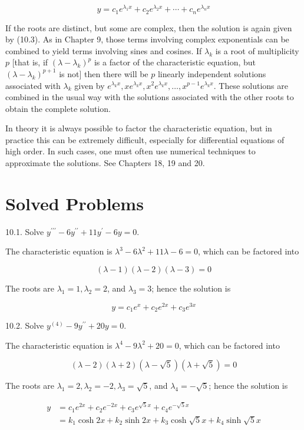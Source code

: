 \documentclass[10pt]{article}
\begin{document}
\begin{equation*}
y=c_{1} e^{\lambda_{1} x}+c_{2} e^{\lambda_{2} x}+\cdots+c_{n} e^{\lambda_{n} x} \tag{10.3}
\end{equation*}


If the roots are distinct, but some are complex, then the solution is again given by (10.3). As in Chapter 9, those terms involving complex exponentials can be combined to yield terms involving sines and cosines. If $\lambda_{k}$ is a root of multiplicity $p$ [that is, if $\left(\lambda-\lambda_{k}\right)^{p}$ is a factor of the characteristic equation, but $\left(\lambda-\lambda_{k}\right)^{p+1}$ is not] then there will be $p$ linearly independent solutions associated with $\lambda_{k}$ given by $e^{\lambda_{k} x}, x e^{\lambda_{k} x}, x^{2} e^{\lambda_{k} x}, \ldots, x^{p-1} e^{\lambda_{k} x}$. These solutions are combined in the usual way with the solutions associated with the other roots to obtain the complete solution.

In theory it is always possible to factor the characteristic equation, but in practice this can be extremely difficult, especially for differential equations of high order. In such cases, one must often use numerical techniques to approximate the solutions. See Chapters 18, 19 and 20.

\section*{Solved Problems}
10.1. Solve $y^{\prime \prime \prime}-6 y^{\prime \prime}+11 y^{\prime}-6 y=0$.

The characteristic equation is $\lambda^{3}-6 \lambda^{2}+11 \lambda-6=0$, which can be factored into

$$
(\lambda-1)(\lambda-2)(\lambda-3)=0
$$

The roots are $\lambda_{1}=1, \lambda_{2}=2$, and $\lambda_{3}=3$; hence the solution is

$$
y=c_{1} e^{x}+c_{2} e^{2 x}+c_{3} e^{3 x}
$$

10.2. Solve $y^{(4)}-9 y^{\prime \prime}+20 y=0$.

The characteristic equation is $\lambda^{4}-9 \lambda^{2}+20=0$, which can be factored into

$$
(\lambda-2)(\lambda+2)(\lambda-\sqrt{5})(\lambda+\sqrt{5})=0
$$

The roots are $\lambda_{1}=2, \lambda_{2}=-2, \lambda_{3}=\sqrt{5}$, and $\lambda_{4}=-\sqrt{5}$; hence the solution is

$$
\begin{aligned}
y & =c_{1} e^{2 x}+c_{2} e^{-2 x}+c_{3} e^{\sqrt{5} x}+c_{4} e^{-\sqrt{5} x} \\
& =k_{1} \cosh 2 x+k_{2} \sinh 2 x+k_{3} \cosh \sqrt{5} x+k_{4} \sinh \sqrt{5} x
\end{aligned}
$$
\end{document}
